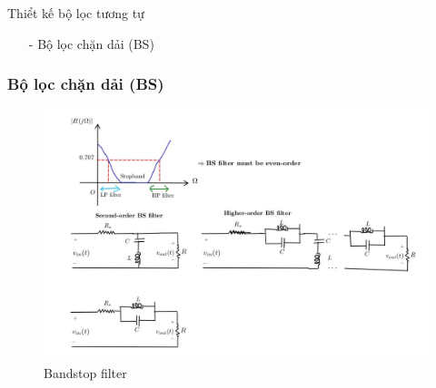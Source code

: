 \documentclass[8pt]{beamer}
\begin{document}
\begin{frame}{Thiểt kế bộ lọc tương tự}
\begin{itemize}
	\item[-] Bộ lọc chặn dải (BS)
\end{itemize}
\subsubsection{Bộ lọc chặn dải (BS)}
\begin{figure}[h]
			\includegraphics[width=1\textwidth]{11.jpg}
		\caption{Bandstop filter}			\label{fig:re2}
		\end{figure}

\end{frame}
\end{document}
